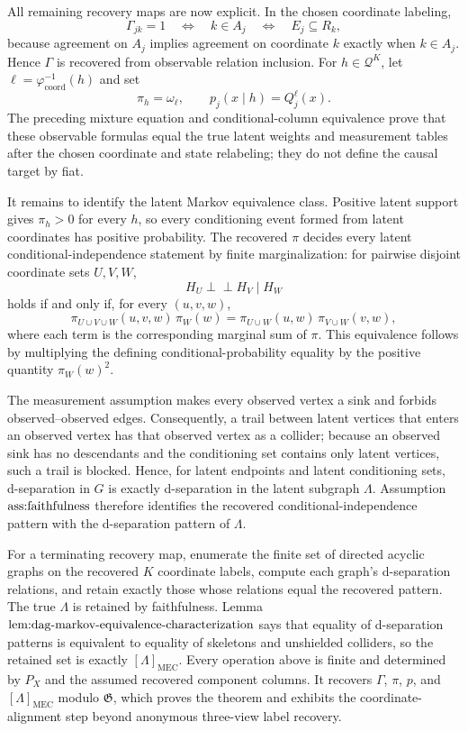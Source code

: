 All remaining recovery maps are now explicit.  In the chosen coordinate labeling,
\[
 \Gamma_{jk}=1
 \quad\Longleftrightarrow\quad
 k\in A_j
 \quad\Longleftrightarrow\quad
 E_j\subseteq R_k,
\]
because agreement on \(A_j\) implies agreement on coordinate \(k\) exactly when \(k\in A_j\).  Hence \(\Gamma\) is recovered from observable relation inclusion.  For \(h\in\mathcal Q^K\), let \(\ell=\varphi_{\mathrm{coord}}^{-1}(h)\) and set
\[
 \pi_h=\omega_\ell,
 \qquad
 p_j(x\mid h)=Q_j^\ell(x).
\]
The preceding mixture equation and conditional-column equivalence prove that these observable formulas equal the true latent weights and measurement tables after the chosen coordinate and state relabeling; they do not define the causal target by fiat.

It remains to identify the latent Markov equivalence class.  Positive latent support gives \(\pi_h>0\) for every \(h\), so every conditioning event formed from latent coordinates has positive probability.  The recovered \(\pi\) decides every latent conditional-independence statement by finite marginalization: for pairwise disjoint coordinate sets \(U,V,W\),
\[
 H_U\mathbin{\perp\!\!\!\perp}H_V\mid H_W
\]
holds if and only if, for every \((u,v,w)\),
\[
 \pi_{U\cup V\cup W}(u,v,w)\,\pi_W(w)
 =\pi_{U\cup W}(u,w)\,\pi_{V\cup W}(v,w),
\]
where each term is the corresponding marginal sum of \(\pi\).  This equivalence follows by multiplying the defining conditional-probability equality by the positive quantity \(\pi_W(w)^2\).

The measurement assumption makes every observed vertex a sink and forbids observed--observed edges.  Consequently, a trail between latent vertices that enters an observed vertex has that observed vertex as a collider; because an observed sink has no descendants and the conditioning set contains only latent vertices, such a trail is blocked.  Hence, for latent endpoints and latent conditioning sets, d-separation in \(G\) is exactly d-separation in the latent subgraph \(\Lambda\).  Assumption~\(\textnormal{ass:faithfulness}\) therefore identifies the recovered conditional-independence pattern with the d-separation pattern of \(\Lambda\).

For a terminating recovery map, enumerate the finite set of directed acyclic graphs on the recovered \(K\) coordinate labels, compute each graph's d-separation relations, and retain exactly those whose relations equal the recovered pattern.  The true \(\Lambda\) is retained by faithfulness.  Lemma~\(\textnormal{lem:dag-markov-equivalence-characterization}\) says that equality of d-separation patterns is equivalent to equality of skeletons and unshielded colliders, so the retained set is exactly \([\Lambda]_{\mathrm{MEC}}\).  Every operation above is finite and determined by \(P_X\) and the assumed recovered component columns.  It recovers \(\Gamma\), \(\pi\), \(p\), and \([\Lambda]_{\mathrm{MEC}}\) modulo \(\mathfrak G\), which proves the theorem and exhibits the coordinate-alignment step beyond anonymous three-view label recovery.
